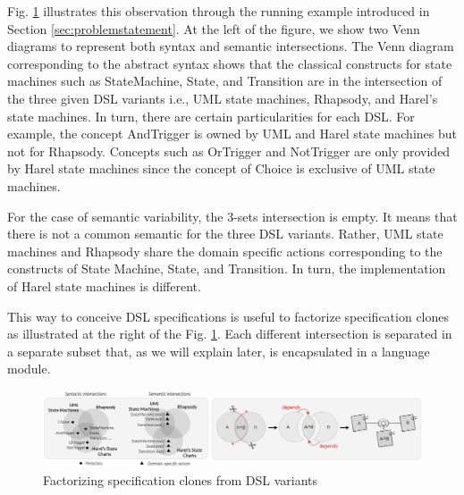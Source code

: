 Fig. \ref{fig:shape} illustrates this observation through the running example introduced in Section \ref{sec:problemstatement}. At the left of the figure, we show two Venn diagrams to represent both syntax and semantic intersections. The Venn diagram corresponding to the abstract syntax shows that the classical constructs for state machines such as StateMachine, State, and Transition are in the intersection of the three given DSL variants i.e., UML state machines, Rhapsody, and Harel's state machines. In turn, there are certain particularities for each DSL. For example, the concept AndTrigger is owned by UML and Harel state machines but not for Rhapsody. Concepts such as OrTrigger and NotTrigger are only provided by Harel state machines since the concept of Choice is exclusive of UML state machines.

For the case of semantic variability, the 3-sets intersection is empty. It means that there is not a common semantic for the three DSL variants. Rather, UML state machines and Rhapsody share the domain specific actions corresponding to the constructs of State Machine, State, and Transition. In turn, the implementation of Harel state machines is different. 

This way to conceive DSL specifications is useful to factorize specification clones as illustrated at the right of the Fig. \ref{fig:shape}. Each different intersection is separated in a separate subset that, as we will explain later, is encapsulated in a language module. 

\begin{figure}
\centering
\includegraphics[width=1\linewidth]{images/principle2.png}
\caption{Factorizing specification clones from DSL variants}
\label{fig:shape}
\end{figure}


